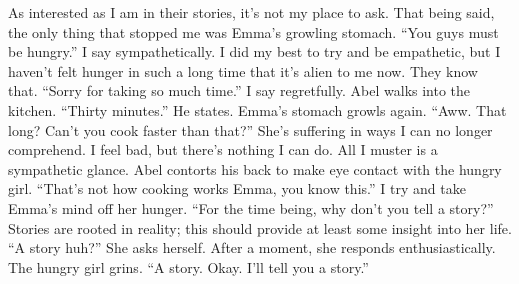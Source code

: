 \documentclass[openany, 12pt]{book}
\newcommand\tab[1][1cm]{\hspace*{#1}}
\begin{document}
\tab
As interested as I am in their stories, it’s not my place to ask. That being said, the only thing that stopped me was Emma’s growling stomach. ``You guys must be hungry.'' I say sympathetically. I did my best to try and be empathetic, but I haven’t felt hunger in such a long time that it’s alien to me now. They know that. ``Sorry for taking so much time.'' I say regretfully.\newline
\tab
Abel walks into the kitchen. ``Thirty minutes.'' He states.\newline
\tab
Emma’s stomach growls again. ``Aww. That long? Can’t you cook faster than that?'' She’s suffering in ways I can no longer comprehend. I feel bad, but there’s nothing I can do. All I muster is a sympathetic glance.\newline
\tab
Abel contorts his back to make eye contact with the hungry girl. ``That’s not how cooking works Emma, you know this.''\newline
\tab
I try and take Emma’s mind off her hunger. ``For the time being, why don’t you tell a story?'' Stories are rooted in reality; this should provide at least some insight into her life.\newline
\tab
``A story huh?'' She asks herself. After a moment, she responds enthusiastically. The hungry girl grins. ``A story. Okay. I’ll tell you a story.'' 
\end{document}
